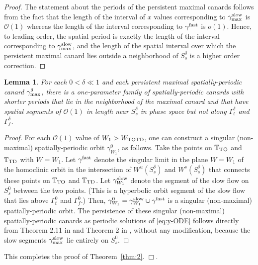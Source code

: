 \documentclass[11pt]{article}
\numberwithin{equation}{section}
\newtheorem{lemma}{Lemma}[section]
\begin{document}
\begin{proof}
The statement about the periods of the persistent maximal canards follows from the fact that the length of the interval of $x$ values corresponding to $\gamma^{\rm slow}_{\rm max}$ is $\mathcal{O}(1)$ whereas the length of the interval corresponding to $\gamma^{\rm fast}$ is $o(1)$.
Hence, to leading order, the spatial period is exactly the length of the interval corresponding to $\gamma^{\rm slow}_{\rm max}$, and the length of the spatial interval over which the persistent maximal canard lies outside a neighborhood of $S_s^\delta$ is a higher order correction.
\end{proof} 

\medskip 
\begin{lemma}  
For each $0<\delta \ll 1$ and each persistent maximal spatially-periodic canard $\gamma^\delta_{\rm max}$, there is a one-parameter family of spatially-periodic canards with shorter periods that lie in the neighborhood of the maximal canard and that have spatial segments of $\mathcal{O}(1)$ in length near $S_s^\delta$ in phase space but not along $\Gamma_t^\delta$ and $\Gamma_f^\delta$.
\end{lemma}

\medskip
\begin{proof} 
For each $\mathcal{O}(1)$ value of $W_1 > W_{\rm TOTD}$,
one can construct a singular (non-maximal) spatially-periodic orbit $\gamma^0_{W_1}$, as follows.
Take the points on $\mathbb{T}_{\rm TO}$ and $\mathbb{T}_{\rm TD}$ with $W=W_1$.
Let $\gamma^{\rm fast}$ denote the singular limit in the plane $W=W_1$ of the homoclinic orbit in the intersection of $W^u(S_s^\delta)$ and $W^s(S_s^\delta)$ that connects these points on $\mathbb{T}_{\rm TO}$ and $\mathbb{T}_{\rm TD}$.  
Let $\gamma^{\rm slow}_{W_1}$ denote the segment of the slow flow on $S_s^0$ between the two points.
(This is a hyperbolic orbit segment of the slow flow that lies above $\Gamma_t^0$ and $\Gamma^0_f$.)
Then, $\gamma^0_{W_1} = \gamma^{\rm slow}_{W_1} \cup\gamma^{\rm fast}$ is a singular (non-maximal) spatially-periodic orbit.
The persistence of these singular (non-maximal) spatially-periodic canards as periodic solutions of \eqref{eq:y-ODE} follows directly from Theorem 2.11 in \cite{dRDR2016} and Theorem 2 in \cite{ST2001}, without any modification, because the slow segments $\gamma^{\rm slow}_{\rm max}$ lie entirely on $S_s^0$.
\end{proof} 

\medskip
\noindent
This completes the proof of Theorem~\ref{thm:2}.
$\Box$.

\medskip
\end{document}
